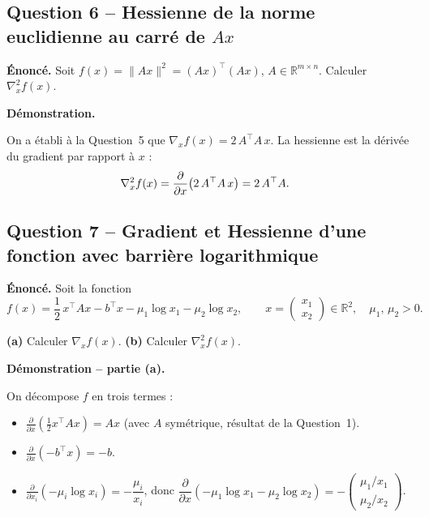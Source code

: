 \documentclass[12pt,a4paper]{article}
\newcommand{\R}{\mathbb{R}}
\newcommand{\grad}{\nabla}
\begin{document}
\medskip
\begin{center}
  \fbox{$\displaystyle \grad_x f(x) = 2\,A^{\top} A\, x$}
\end{center}

\subsection*{Question 6 -- Hessienne de la norme euclidienne au carré de $Ax$}

\textbf{Énoncé.}
Soit $f(x) = \|Ax\|^2 = (Ax)^{\top}(Ax)$, $A \in \R^{m \times n}$.
Calculer $\grad_x^2 f(x)$.

\medskip
\textbf{Démonstration.}

On a établi à la Question~5 que $\grad_x f(x) = 2\,A^{\top} A\,x$.
La hessienne est la dérivée du gradient par rapport à $x$ :
\begin{align}
  \grad_x^2 f(x)
    &= \frac{\partial}{\partial x}\!\left(2\,A^{\top} A\, x\right)
     = 2\,A^{\top} A. \notag
\end{align}

\medskip
\begin{center}
  \fbox{$\displaystyle \grad_x^2 f(x) = 2\,A^{\top} A$}
\end{center}

\subsection*{Question 7 -- Gradient et Hessienne d'une fonction avec barrière logarithmique}

\textbf{Énoncé.}
Soit la fonction
\[
  f(x) = \frac{1}{2}\,x^{\top} A x - b^{\top} x
         - \mu_1 \log x_1 - \mu_2 \log x_2,
  \qquad
  x = \begin{pmatrix} x_1 \\ x_2 \end{pmatrix} \in \R^{2},\quad
  \mu_1,\, \mu_2 > 0.
\]

\textbf{(a)} Calculer $\grad_x f(x)$. \quad
\textbf{(b)} Calculer $\grad_x^2 f(x)$.

\medskip
\textbf{Démonstration -- partie (a).}

On décompose $f$ en trois termes :
\begin{itemize}
  \item $\frac{\partial}{\partial x}\!\left(\frac{1}{2}x^{\top} A x\right) = Ax$
        (avec $A$ symétrique, résultat de la Question~1).
  \item $\frac{\partial}{\partial x}\!\left(-b^{\top} x\right) = -b$.
  \item $\frac{\partial}{\partial x_i}\!\left(-\mu_i \log x_i\right)
        = -\dfrac{\mu_i}{x_i}$,
        donc $\dfrac{\partial}{\partial x}\!\left(-\mu_1\log x_1 - \mu_2\log x_2\right)
        = -\begin{pmatrix} \mu_1/x_1 \\ \mu_2/x_2 \end{pmatrix}$.
\end{itemize}
\end{document}
